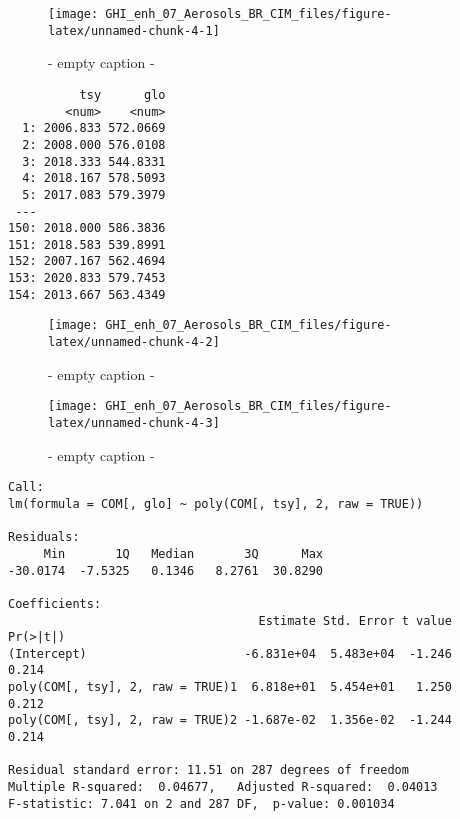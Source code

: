 \documentclass[
  10pt,
  a4paper,oneside]{article}
\begin{document}
\begin{figure}[H]

{\centering \texttt{[image: GHI\_enh\_07\_Aerosols\_BR\_CIM\_files/figure-latex/unnamed-chunk-4-1]} 

}

\caption{ - empty caption - }\label{fig:unnamed-chunk-4-1}
\end{figure}

\begin{verbatim}
          tsy      glo
        <num>    <num>
  1: 2006.833 572.0669
  2: 2008.000 576.0108
  3: 2018.333 544.8331
  4: 2018.167 578.5093
  5: 2017.083 579.3979
 ---                  
150: 2018.000 586.3836
151: 2018.583 539.8991
152: 2007.167 562.4694
153: 2020.833 579.7453
154: 2013.667 563.4349
\end{verbatim}

\begin{figure}[H]

{\centering \texttt{[image: GHI\_enh\_07\_Aerosols\_BR\_CIM\_files/figure-latex/unnamed-chunk-4-2]} 

}

\caption{ - empty caption - }\label{fig:unnamed-chunk-4-2}
\end{figure}
\begin{figure}[H]

{\centering \texttt{[image: GHI\_enh\_07\_Aerosols\_BR\_CIM\_files/figure-latex/unnamed-chunk-4-3]} 

}

\caption{ - empty caption - }\label{fig:unnamed-chunk-4-3}
\end{figure}

\begin{verbatim}
Call:
lm(formula = COM[, glo] ~ poly(COM[, tsy], 2, raw = TRUE))

Residuals:
     Min       1Q   Median       3Q      Max 
-30.0174  -7.5325   0.1346   8.2761  30.8290 

Coefficients:
                                   Estimate Std. Error t value Pr(>|t|)
(Intercept)                      -6.831e+04  5.483e+04  -1.246    0.214
poly(COM[, tsy], 2, raw = TRUE)1  6.818e+01  5.454e+01   1.250    0.212
poly(COM[, tsy], 2, raw = TRUE)2 -1.687e-02  1.356e-02  -1.244    0.214

Residual standard error: 11.51 on 287 degrees of freedom
Multiple R-squared:  0.04677,   Adjusted R-squared:  0.04013 
F-statistic: 7.041 on 2 and 287 DF,  p-value: 0.001034
\end{verbatim}
\end{document}
